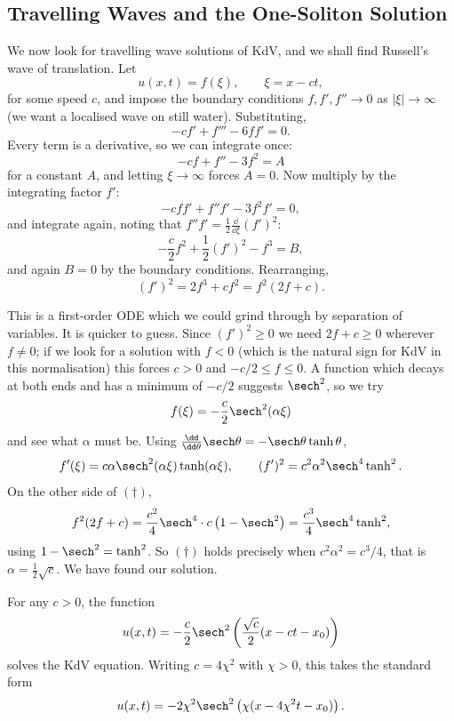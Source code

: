 \subsection{Travelling Waves and the One-Soliton Solution}

We now look for travelling wave solutions of KdV, and we shall find Russell's wave of translation. Let
$$
u(x,t) = f(\xi), \qquad \xi = x - ct,
$$
for some speed $c$, and impose the boundary conditions $f, f', f''\to 0$ as $|\xi|\to\infty$ (we want a localised wave on still water). Substituting,
$$
-cf' + f''' - 6ff' = 0.
$$
Every term is a derivative, so we can integrate once:
$$
-cf + f'' - 3f^2 = A
$$
for a constant $A$, and letting $\xi\to\infty$ forces $A = 0$. Now multiply by the integrating factor $f'$:
$$
-cff' + f''f' - 3f^2f' = 0,
$$
and integrate again, noting that $f''f' = \frac{1}{2}\frac{\dd}{\dd\xi}(f')^2$:
$$
-\frac{c}{2}f^2 + \frac{1}{2}(f')^2 - f^3 = B,
$$
and again $B = 0$ by the boundary conditions. Rearranging,
\begin{equation*}
(f')^2 = 2f^3 + cf^2 = f^2(2f + c). \tag{$\dagger$}
\end{equation*}

This is a first-order ODE which we could grind through by separation of variables. It is quicker to guess. Since $(f')^2 \ge 0$ we need $2f + c \ge 0$ wherever $f\neq 0$; if we look for a solution with $f < 0$ (which is the natural sign for KdV in this normalisation) this forces $c > 0$ and $-c/2 \le f \le 0$. A function which decays at both ends and has a minimum of $-c/2$ suggests $\sech^2$, so we try
$$
f(\xi) = -\frac{c}{2}\sech^2(\alpha\xi)
$$
and see what $\alpha$ must be. Using $\frac{\dd}{\dd\theta}\sech\theta = -\sech\theta\tanh\theta$,
$$
f'(\xi) = c\alpha\sech^2(\alpha\xi)\tanh(\alpha\xi), \qquad (f')^2 = c^2\alpha^2\sech^4\tanh^2.
$$
On the other side of $(\dagger)$,
$$
f^2(2f+c) = \frac{c^2}{4}\sech^4\cdot c\left(1 - \sech^2\right) = \frac{c^3}{4}\sech^4\tanh^2,
$$
using $1 - \sech^2 = \tanh^2$. So $(\dagger)$ holds precisely when $c^2\alpha^2 = c^3/4$, that is $\alpha = \frac{1}{2}\sqrt c$. We have found our solution.

\begin{proposition}
	For any $c>0$, the function
	$$
	u(x,t) = -\frac{c}{2}\sech^2\left(\frac{\sqrt c}{2}(x - ct - x_0)\right)
	$$
	solves the KdV equation. Writing $c = 4\chi^2$ with $\chi>0$, this takes the standard form
	$$
	u(x,t) = -2\chi^2\sech^2\left(\chi(x - 4\chi^2 t - x_0)\right).
	$$
\end{proposition}

